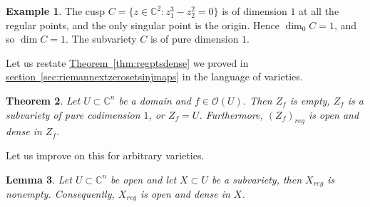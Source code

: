 \documentclass[12pt,openany]{book}
\newcommand{\C}{{\mathbb{C}}}
\newcommand{\sO}{{\mathscr{O}}}
\theoremstyle{plain}
\newtheorem{thm}{Theorem}[section]
\newtheorem{lemma}[thm]{Lemma}
\theoremstyle{remark}
\theoremstyle{definition}
\theoremstyle{exercise}
\theoremstyle{example}
\newtheorem{example}[thm]{Example}
\newcommand{\sectionref}[1]{\hyperref[#1]{section~\ref*{#1}}}
\newcommand{\thmref}[1]{\hyperref[#1]{Theorem~\ref*{#1}}}
\begin{document}
\begin{example}
The cusp $C = \bigl\{ z \in \C^2 : z_1^3-z_2^2 = 0 \bigr\}$ is of
dimension $1$ at all the regular points, and the only singular point is the
origin.  Hence $\dim_0 C = 1$, and so $\dim C = 1$.  The subvariety $C$ is
of pure dimension $1$.
\end{example}

Let us restate
\thmref{thm:regptsdense} we proved in
\sectionref{sec:riemannextzerosetsinjmaps}
in the language of varieties.

\begin{thm} \label{thm:regptsdense2}
Let $U \subset \C^n$ be a domain and $f \in \sO(U)$.
Then $Z_f$ is empty,
$Z_f$ is a subvariety of pure codimension $1$,
or $Z_f = U$.
Furthermore,
$(Z_f)_{\mathit{reg}}$ is open and dense in $Z_f$.
\end{thm}

Let us improve on this for arbitrary varieties.

\begin{lemma} \label{lemma:regdense}
Let $U \subset \C^n$ be open and let $X \subset U$ be a subvariety,
then $X_{\mathit{reg}}$ is nonempty.  Consequently, $X_{\mathit{reg}}$ is
open and dense in $X$.
\end{lemma}
\end{document}
